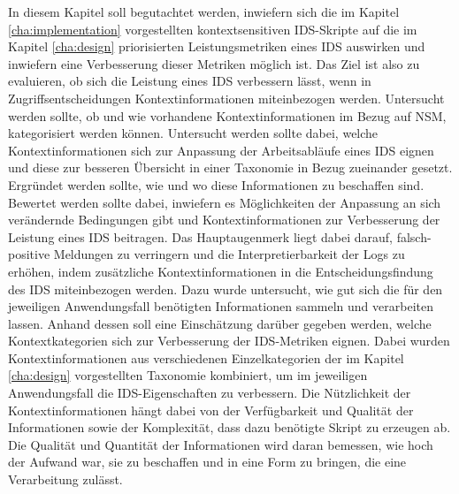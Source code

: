 In diesem Kapitel soll begutachtet werden, inwiefern sich die im Kapitel \ref{cha:implementation} vorgestellten kontextsensitiven IDS-Skripte auf die im Kapitel \ref{cha:design} priorisierten Leistungsmetriken eines IDS auswirken und inwiefern eine Verbesserung dieser Metriken möglich ist. Das Ziel ist also zu evaluieren, ob sich die Leistung eines IDS verbessern lässt, wenn in Zugriffsentscheidungen Kontextinformationen miteinbezogen werden.
Untersucht werden sollte, ob und wie vorhandene Kontextinformationen im Bezug auf NSM, kategorisiert werden können.
Untersucht werden sollte dabei, welche Kontextinformationen sich zur Anpassung der Arbeitsabläufe eines IDS eignen und diese zur besseren Übersicht in einer Taxonomie in Bezug zueinander gesetzt.
Ergründet werden sollte, wie und wo diese Informationen zu beschaffen sind.
Bewertet werden sollte dabei, inwiefern es Möglichkeiten der Anpassung an sich verändernde Bedingungen gibt und Kontextinformationen zur Verbesserung der Leistung eines IDS beitragen.
Das Hauptaugenmerk liegt dabei darauf, falsch-positive Meldungen zu verringern und die Interpretierbarkeit der Logs zu erhöhen, indem zusätzliche Kontextinformationen in die Entscheidungsfindung des IDS miteinbezogen werden. Dazu wurde untersucht, wie gut sich die für den jeweiligen Anwendungsfall benötigten Informationen sammeln und verarbeiten lassen. Anhand dessen soll eine Einschätzung darüber gegeben werden, welche Kontextkategorien sich zur Verbesserung der IDS-Metriken eignen.
Dabei wurden Kontextinformationen aus verschiedenen Einzelkategorien der im Kapitel \ref{cha:design} vorgestellten Taxonomie kombiniert, um im jeweiligen Anwendungsfall die IDS-Eigenschaften zu verbessern.
Die Nützlichkeit der Kontextinformationen hängt dabei von der Verfügbarkeit und Qualität der Informationen sowie der Komplexität, dass dazu benötigte Skript zu erzeugen ab. 
Die Qualität und Quantität der Informationen wird daran bemessen, wie hoch der Aufwand war, sie zu beschaffen und in eine Form zu bringen, die eine Verarbeitung zulässt.




